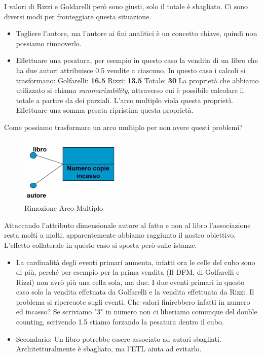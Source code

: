 I valori di Rizzi e Goldarelli però sono giusti, solo il totale è sbagliato.
Ci sono diversi modi per fronteggiare questa situazione.
\begin{itemize}
	\item Togliere l'autore, ma l'autore ai fini analitici è un concetto chiave, quindi non possiamo rimuoverlo.
	\item Effettuare una pesatura, per esempio in questo caso la vendita di un libro che ha due autori attribuisce 0.5 vendite a ciascuno. In questo caso i calcoli si trasformano:\newline\newline
	Golfarelli: \textbf{16.5}\newline
	Rizzi: \textbf{13.5}\newline
	Totale: \textbf{30}\newline\newline
	La proprietà che abbiamo utilizzato si chiama \textit{summarizability}, attraverso cui è possibile calcolare il totale a partire da dei parziali. L'arco multiplo viola questa proprietà. Effettuare una somma pesata ripristina questa proprietà.
\end{itemize}
\noindent Come possiamo trasformare un arco multiplo per non avere questi problemi?
\begin{figure}[H]
	\begin{center}
		\includegraphics[width=0.4\linewidth]{img/removemult.PNG}
		\caption{Rimozione Arco Multiplo}
	\end{center}
\end{figure}
\noindent Attaccando l'attributo dimensionale autore al fatto e non al libro l'associazione resta molti a molti, apparentemente abbiamo raggiunto il nostro obiettivo. L'effetto collaterale in questo caso si sposta però sulle istanze.
\begin{itemize}
	\item La cardinalità degli eventi primari aumenta, infatti ora le celle del cubo sono di più, perché per esempio per la prima vendita (Il DFM, di Golfarelli e Rizzi) non avrò più una cella sola, ma due. I due eventi primari in questo caso solo la vendita effetuata da Golfarelli e la vendita effettuata da Rizzi. Il problema si ripercuote sugli eventi.\newline
	Che valori finirebbero infatti in numero ed incasso? Se scriviamo "3" in numero non ci liberiamo comunque del double counting, scrivendo 1.5 stiamo forzando la pesatura dentro il cubo.\newline
	\item Secondario: Un libro potrebbe essere associato ad autori sbagliati. Architetturalmente è sbagliato, ma l'ETL aiuta ad evitarlo.
\end{itemize}
